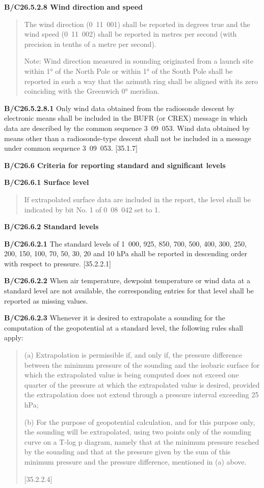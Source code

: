 \textbf{B/C26.5.2.8 Wind direction} \textbf{and speed}

\begin{quote}
The wind direction (0~11~001) shall be reported in degrees true and the wind speed (0~11~002) shall be reported in metres per second (with precision in tenths of a metre per second).

Note: Wind direction measured in sounding originated from a launch site within 1° of the North Pole or within 1° of the South Pole shall be reported in such a way that the azimuth ring shall be aligned with its zero coinciding with the Greenwich 0° meridian.
\end{quote}

\textbf{B/C26.5.2.8.1} Only wind data obtained from the radiosonde descent by electronic means shall be included in the BUFR (or CREX) message in which data are described by the common sequence 3~09~053. Wind data obtained by means other than a radiosonde-type descent shall not be included in a message under common sequence 3~09~053. {[}35.1.7{]}

\textbf{B/C26.6 Criteria for reporting standard and significant levels}

\textbf{B/C26.6.1 Surface level}

\begin{quote}
If extrapolated surface data are included in the report, the level shall be indicated by bit No. 1 of 0~08~042 set to 1.
\end{quote}

\textbf{B/C26.6.2 Standard levels}

\textbf{B/C26.6.2.1} The standard levels of 1~000, 925, 850, 700, 500, 400, 300, 250, 200, 150, 100, 70, 50, 30, 20 and 10 hPa shall be reported in descending order with respect to pressure. {[}35.2.2.1{]}

\textbf{B/C26.6.2.2} When air temperature, dewpoint temperature or wind data at a standard level are not available, the corresponding entries for that level shall be reported as missing values.

\textbf{B/C26.6.2.3} Whenever it is desired to extrapolate a sounding for the computation of the geopotential at a standard level, the following rules shall apply:

\begin{quote}
(a) Extrapolation is permissible if, and only if, the pressure difference between the minimum pressure of the sounding and the isobaric surface for which the extrapolated value is being computed does not exceed one quarter of the pressure at which the extrapolated value is desired, provided the extrapolation does not extend through a pressure interval exceeding 25 hPa;

(b) For the purpose of geopotential calculation, and for this purpose only, the sounding will be extrapolated, using two points only of the sounding curve on a T-log p diagram, namely that at the minimum pressure reached by the sounding and that at the pressure given by the sum of this minimum pressure and the pressure difference, mentioned in (a) above.

{[}35.2.2.4{]}
\end{quote}

